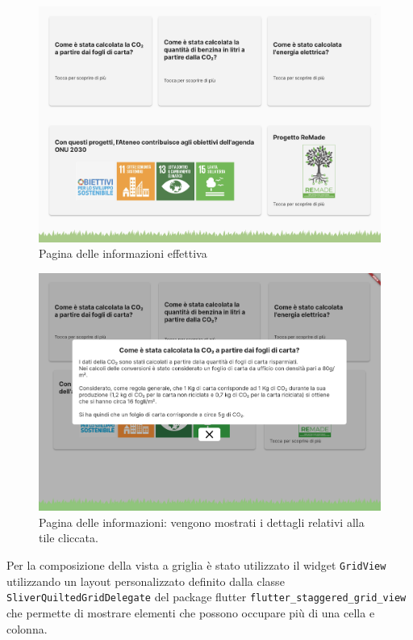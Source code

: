 \begin{figure}[h]
  \centering
  \includegraphics[width=\textwidth]{img/totem/screenshot/infoPageScreen.png}
  \caption{Pagina delle informazioni effettiva}
  \label{fig:infoPage}
\end{figure}
\begin{figure}[h]
  \centering
  \includegraphics[width=\textwidth]{img/totem/screenshot/infoPagePopupScreen.png}
  \caption{Pagina delle informazioni: vengono mostrati i dettagli relativi alla tile cliccata.}
  \label{fig:infoPagePopup}
\end{figure}

Per la composizione della vista a griglia è stato utilizzato il widget \texttt{GridView} utilizzando un layout personalizzato definito dalla classe \texttt{SliverQuiltedGridDelegate} del package flutter \texttt{flutter\_staggered\_grid\_view} \cite{staggeredGridView} che permette di mostrare elementi che possono occupare più di una cella e colonna.

